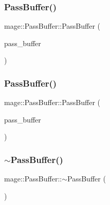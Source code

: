 \subsubsection{\texorpdfstring{Pass\+Buffer()}{PassBuffer()}\hspace{0.1cm}{\footnotesize\ttfamily [2/3]}}
{\footnotesize\ttfamily mage\+::\+Pass\+Buffer\+::\+Pass\+Buffer (\begin{DoxyParamCaption}\item[{const \hyperlink{structmage_1_1_pass_buffer}{Pass\+Buffer} \&}]{pass\+\_\+buffer }\end{DoxyParamCaption})\hspace{0.3cm}{\ttfamily [default]}}

\hypertarget{structmage_1_1_pass_buffer_a8f6baa279c6dc8c5b6869240d0169677}{}\label{structmage_1_1_pass_buffer_a8f6baa279c6dc8c5b6869240d0169677} 
\subsubsection{\texorpdfstring{Pass\+Buffer()}{PassBuffer()}\hspace{0.1cm}{\footnotesize\ttfamily [3/3]}}
{\footnotesize\ttfamily mage\+::\+Pass\+Buffer\+::\+Pass\+Buffer (\begin{DoxyParamCaption}\item[{\hyperlink{structmage_1_1_pass_buffer}{Pass\+Buffer} \&\&}]{pass\+\_\+buffer }\end{DoxyParamCaption})\hspace{0.3cm}{\ttfamily [default]}}

\hypertarget{structmage_1_1_pass_buffer_a650dec579522b7d5c5810a535b10773a}{}\label{structmage_1_1_pass_buffer_a650dec579522b7d5c5810a535b10773a} 
\subsubsection{\texorpdfstring{$\sim$\+Pass\+Buffer()}{~PassBuffer()}}
{\footnotesize\ttfamily mage\+::\+Pass\+Buffer\+::$\sim$\+Pass\+Buffer (\begin{DoxyParamCaption}{ }\end{DoxyParamCaption})\hspace{0.3cm}{\ttfamily [default]}}



